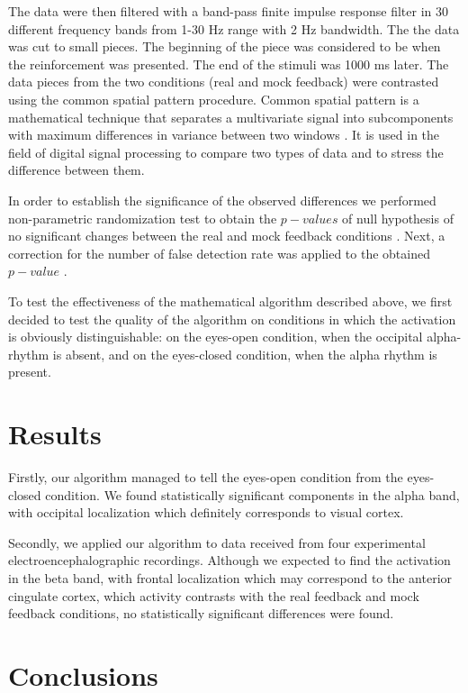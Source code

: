 \documentclass[14pt,a4paper]{scrartcl}
\begin{document}
The data were then filtered with a band-pass finite impulse response filter in 30 different frequency bands from 1-30 Hz range with 2 Hz bandwidth. The the data was cut to small pieces. The beginning of the piece was considered to be when the reinforcement was presented. The end of the stimuli was 1000 ms later. The data pieces from the two conditions (real and mock feedback) were contrasted using the common spatial pattern procedure. Common spatial pattern is a mathematical technique that separates a multivariate signal into subcomponents with maximum differences in variance between two windows \cite{Koles1990}. It is used in the field of digital signal processing to compare two types of data and to stress the difference between them.

In order to establish the significance of the observed differences we performed non-parametric randomization test to obtain the $p-values$ of null hypothesis of no significant changes between the real and mock feedback conditions \cite{Maris2007}. Next, a correction for the number of false detection rate was applied to the obtained $p-value$ \cite{Benjamini2001}.

To test the effectiveness of the mathematical algorithm described above, we first decided to test the quality of the algorithm on conditions in which the activation is obviously distinguishable: on the eyes-open condition, when the occipital alpha-rhythm is absent, and on the eyes-closed condition, when the alpha rhythm is present.


\newpage
\section{Results}
\label{sec:Results}  

Firstly, our algorithm managed to tell the eyes-open condition from the eyes-closed condition. We found statistically significant components in the alpha band, with occipital localization which definitely corresponds to visual cortex.

Secondly, we applied our algorithm to data received from four experimental electroencephalographic recordings. Although we expected to find the activation in the beta band, with frontal localization which may correspond to the anterior cingulate cortex, which activity contrasts with the real feedback and mock feedback conditions, no statistically significant differences were found.

\newpage
\section{Conclusions}
\label{sec:Conclusions} 
\end{document}
